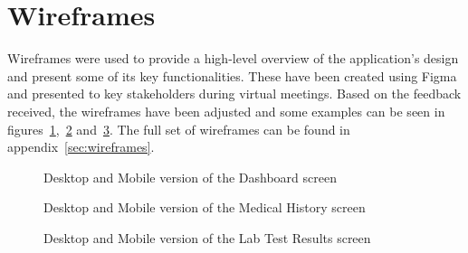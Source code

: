\FloatBarrier{}

\section{Wireframes}

Wireframes were used to provide a high-level overview of the application's design and present some of its key functionalities. These have been created using Figma and presented to key stakeholders during virtual meetings. Based on the feedback received, the wireframes have been adjusted and some examples can be seen in figures~\ref{fig:dashboard},~\ref{fig:medhistory} and~\ref{fig:lab}. The full set of wireframes can be found in appendix~\ref{sec:wireframes}.

\begin{figure}[ht]
    \centering
    \begin{minipage}[c]{0.70\textwidth}
    \end{minipage}
    \hspace{0.05\textwidth}
    \begin{minipage}[c]{0.20\textwidth}
    \end{minipage}
    \caption{Desktop and Mobile version of the Dashboard screen}\label{fig:dashboard}
\end{figure}

\begin{figure}[ht]
    \centering
    \begin{minipage}[c]{0.70\textwidth}
    \end{minipage}
    \hspace{0.05\textwidth}
    \begin{minipage}[c]{0.20\textwidth}
    \end{minipage}
    \caption{Desktop and Mobile version of the Medical History screen}\label{fig:medhistory}
\end{figure}

\begin{figure}[ht]
    \centering
    \begin{minipage}[c]{0.70\textwidth}
    \end{minipage}
    \hspace{0.05\textwidth}
    \begin{minipage}[c]{0.20\textwidth}
    \end{minipage}
    \caption{Desktop and Mobile version of the Lab Test Results screen}\label{fig:lab}
\end{figure}

